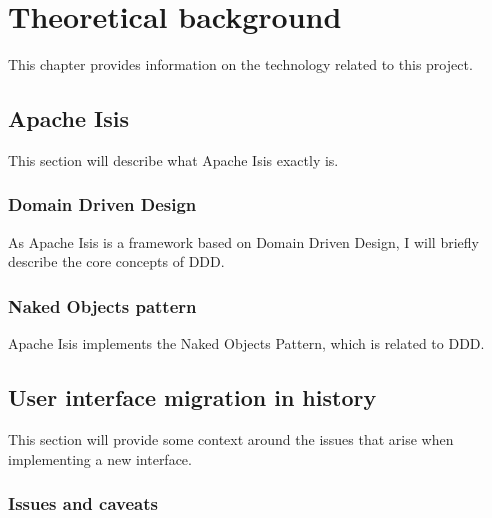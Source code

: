 \chapter{Theoretical background}
\label{chapter:theoreticalbackground}
This chapter provides information on the technology related to this project.

\section{Apache Isis}
\label{section:apacheisis}
This section will describe what Apache Isis exactly is.

\subsection{Domain Driven Design}
\label{subsection:domaindrivendesign}
As Apache Isis is a framework based on Domain Driven Design, I will briefly describe the core concepts of DDD.

\subsection{Naked Objects pattern}
\label{subsection:nakedobjectspattern}
Apache Isis implements the Naked Objects Pattern, which is related to DDD.

\section{User interface migration in history}
\label{section:userinterfacemigrationinhistory}
This section will provide some context around the issues that arise when implementing a new interface.

\subsection{Issues and caveats}
\label{subsection:issuesandcaveats}